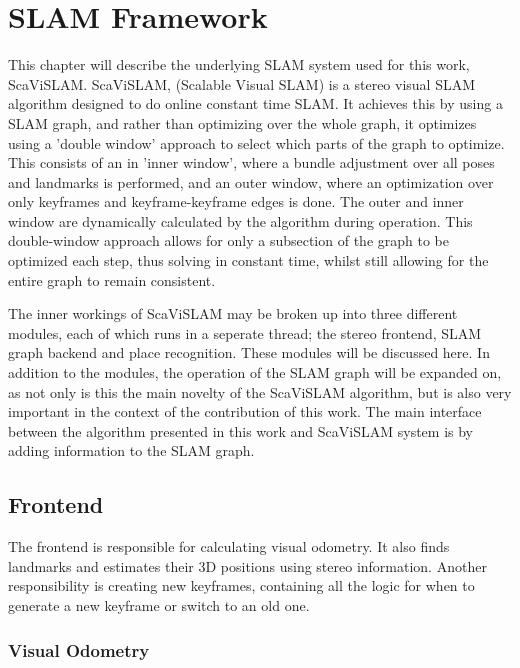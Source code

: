 \chapter{SLAM Framework}
\label{chapter:ScaViSLAM}

This chapter will describe the underlying SLAM system used for this work, \\ \mbox{ScaViSLAM}.  \mbox{ScaViSLAM}, (Scalable Visual SLAM) is a stereo visual SLAM algorithm designed to do online constant time SLAM. It achieves this by using a SLAM graph, and rather than optimizing over the whole graph, it optimizes using a 'double window' approach to select which parts of the graph to optimize.  This consists of an in 'inner window', where a bundle adjustment over all poses and landmarks is performed, and an outer window, where an optimization over only keyframes and keyframe-keyframe edges is done. The outer and inner window are dynamically calculated by the algorithm during operation.  This double-window approach allows for only a subsection of the graph to be optimized each step, thus solving in constant time, whilst still allowing for the entire graph to remain consistent.

The inner workings of ScaViSLAM may be broken up into three different modules, each of which runs in a seperate thread; the stereo frontend, SLAM graph backend and place recognition. These modules will be discussed here. In addition to the modules, the operation of the SLAM graph will be expanded on, as not only is this the main novelty of the ScaViSLAM algorithm, but is also very important in the context of the contribution of this work. The main interface between the algorithm presented in this work and ScaViSLAM system is by adding information to the SLAM graph.

\section{Frontend}
\label{sec:scavislam_frontend}

The frontend is responsible for calculating visual odometry.  It also finds landmarks and estimates their 3D positions using stereo information.  Another responsibility is creating new keyframes, containing all the logic for when to generate a new keyframe or switch to an old one. 

\subsection{Visual Odometry}

